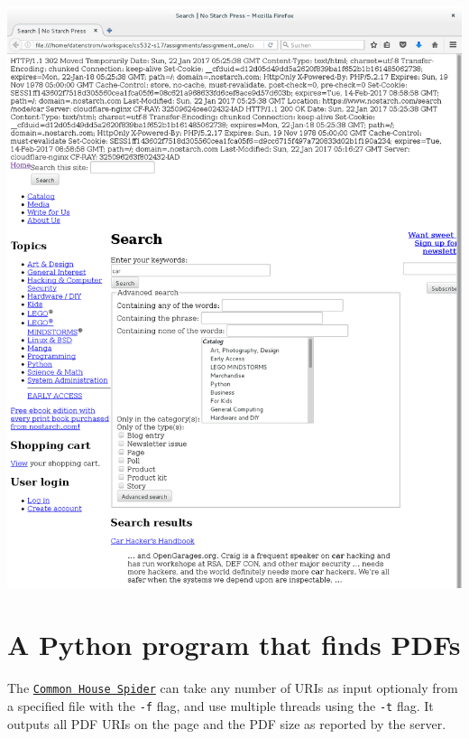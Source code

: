 \documentclass[12pt, a4paper]{article}
\newcommand{\code}[1]{\texttt{#1}}
\begin{document}
\href{https://gitlab.com/datenstrom/cs532-s17/blob/master/assignments/assignment_one/curl/results.html}{
\includegraphics[width=\textwidth]{dia/curl_screenshot.png}
}



\section{A Python program that finds PDFs}

The \href{https://gitlab.com/datenstrom/cs532-s17/tree/master/assignments/assignment_one/common_house_spider}
{\code{Common House Spider}} can take any number of URIs as input
optionaly from a specified file with the \code{-f} flag, and use
multiple threads using the \code{-t} flag.
It outputs all PDF URIs on the page and the PDF size as reported
by the server.
\end{document}
